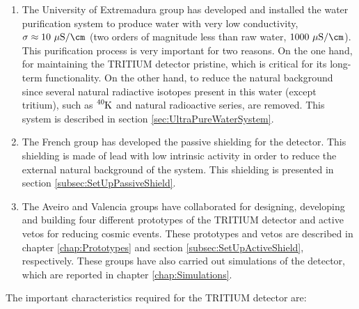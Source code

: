 \begin{enumerate}
\item{} The University of Extremadura group has developed and installed the water purification system to produce water with very low conductivity, $\sigma \approx 10~\mu\text{S}/\cm$ (two orders of magnitude less than raw water, $1000~\mu\text{S}/\cm$). This purification process is very important for two reasons. On the one hand, for maintaining the TRITIUM detector pristine, which is critical for its long-term functionality. On the other hand, to reduce the natural background since several natural radiactive isotopes present in this water (except tritium), such as $\ce{^{40}K}$ and natural radioactive series, are removed. This system is described in section \ref{sec:UltraPureWaterSystem}.

\item{} The French group has developed the passive shielding for the detector. This shielding is made of lead with low intrinsic activity in order to reduce the external natural background of the system. This shielding is presented in section \ref{subsec:SetUpPassiveShield}.

\item{} The Aveiro and Valencia groups have collaborated for designing, developing and building four different prototypes of the TRITIUM detector and active vetos for reducing cosmic events. These prototypes and vetos are described in chapter \ref{chap:Prototypes} and section \ref{subsec:SetUpActiveShield}, respectively. These groups have also carried out simulations of the detector, which are reported in chapter \ref{chap:Simulations}.

\end{enumerate}

The important characteristics required for the TRITIUM detector are:

